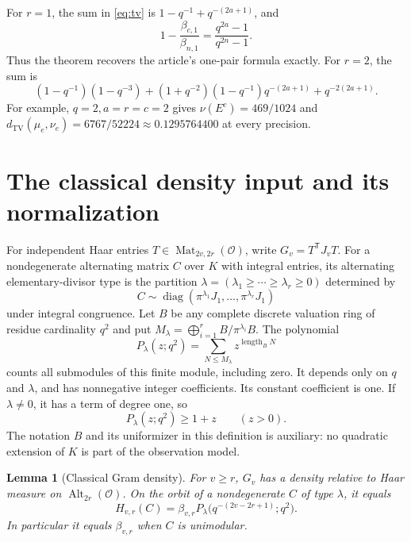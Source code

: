 \documentclass[11pt]{article}
\newtheorem{lemma}[theorem]{Lemma}
\newcommand{\OO}{\mathcal O}
\newcommand{\Alt}{\operatorname{Alt}}
\newcommand{\Mat}{\operatorname{Mat}}
\newcommand{\TV}{d_{\mathrm{TV}}}
\newcommand{\length}{\operatorname{length}}
\begin{document}
For $r=1$, the sum in \eqref{eq:tv} is $1-q^{-1}+q^{-(2a+1)}$, and
\[
 1-\frac{\beta_{c,1}}{\beta_{n,1}}=\frac{q^{2a}-1}{q^{2n}-1}.
\]
Thus the theorem recovers the article's one-pair formula exactly. For $r=2$, the sum is
\[
 (1-q^{-1})(1-q^{-3})+(1+q^{-2})(1-q^{-1})q^{-(2a+1)}+q^{-2(2a+1)}.
\]
For example, $q=2,a=r=c=2$ gives $\nu(E^c)=469/1024$ and
$\TV(\mu_e,\nu_e)=6767/52224\approx0.1295764400$ at every precision.

\section{The classical density input and its normalization}
For independent Haar entries $T\in\Mat_{2v,2r}(\OO)$, write
$G_v=T^{\mathsf T}J_vT$. For a nondegenerate alternating matrix $C$ over $K$ with integral entries, its alternating elementary-divisor type is the partition
$\lambda=(\lambda_1\ge\cdots\ge\lambda_r\ge0)$ determined by
\[
 C\sim\operatorname{diag}(\pi^{\lambda_1}J_1,\ldots,\pi^{\lambda_r}J_1)
\]
under integral congruence. Let $B$ be any complete discrete valuation ring of residue cardinality $q^2$ and put
$M_\lambda=\bigoplus_{i=1}^r B/\pi^{\lambda_i}B$. The polynomial
\[
 P_\lambda(z;q^2)=\sum_{N\le M_\lambda}z^{\length_B N}
\]
counts all submodules of this finite module, including zero. It depends only on $q$ and $\lambda$, and has nonnegative integer coefficients. Its constant coefficient is one. If $\lambda\ne0$, it has a term of degree one, so
\begin{equation}\label{eq:poly-lower}
 P_\lambda(z;q^2)\ge1+z\qquad(z>0).
\end{equation}
The notation $B$ and its uniformizer in this definition is auxiliary: no quadratic extension of $K$ is part of the observation model.

\begin{lemma}[Classical Gram density]\label{lem:gram}
For $v\ge r$, $G_v$ has a density relative to Haar measure on $\Alt_{2r}(\OO)$. On the orbit of a nondegenerate $C$ of type $\lambda$, it equals
\begin{equation}\label{eq:gram}
 H_{v,r}(C)=\beta_{v,r}
 P_\lambda\bigl(q^{-(2v-2r+1)};q^2\bigr).
\end{equation}
In particular it equals $\beta_{v,r}$ when $C$ is unimodular.
\end{lemma}
\end{document}

